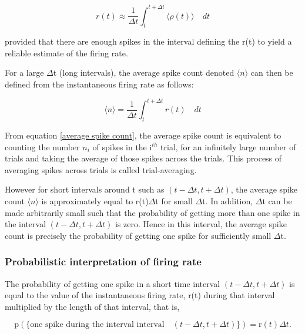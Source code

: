 \[ 
r(t) \approx  \displaystyle  \frac{1}{\Delta t}  \int_{t}^{t+\Delta t} 
 \langle \rho(t) \rangle \quad dt 
\]

provided that there are enough spikes in the interval defining the r(t)
to yield a reliable estimate of the firing rate.

For a large $\Delta$t (long intervals), the average spike count denoted $\langle n  \rangle$ can then be  defined from the instantaneous firing rate as follows:

\begin{equation}\label{average spike count}
\langle n \rangle =  \displaystyle  \frac{1}{\Delta t}  
\int_{t}^{t+\Delta t}  r(t)  \quad dt 
\end{equation}

From equation \eqref{average spike count}, the average spike count is equivalent
to counting the number $n_{i}$  of spikes in the i$^{th}$ trial, for an infinitely large number of trials and taking the average of those spikes across the trials. This process of averaging spikes across trials is called trial-averaging.


However for short intervals around t such as $(t-\Delta t, t+\Delta t)$, the average spike count    $\langle n \rangle$ is approximately equal 
to r(t)$\Delta$t for small $\Delta$t.
In addition, $\Delta$t can be made arbitrarily small such that
the probability of getting more than one spike in the interval
 $(t-\Delta t, t+\Delta t)$ is zero. 
Hence in this interval, the average spike count is precisely the probability of getting one spike for sufficiently small $\Delta$t.


\subsubsection{Probabilistic interpretation of firing rate}
The probability of getting one spike in a short time interval  $(t-\Delta t, t+\Delta t)$ is equal to the value of the instantaneous firing rate, r(t) during that interval multiplied by the length of that interval, that is,

\[ 
\displaystyle  \text{p}(\{ \text{one spike during the interval interval} \quad  (t-\Delta t, t+\Delta t)  \}) = \text{r}(t)\Delta t. 
\]

